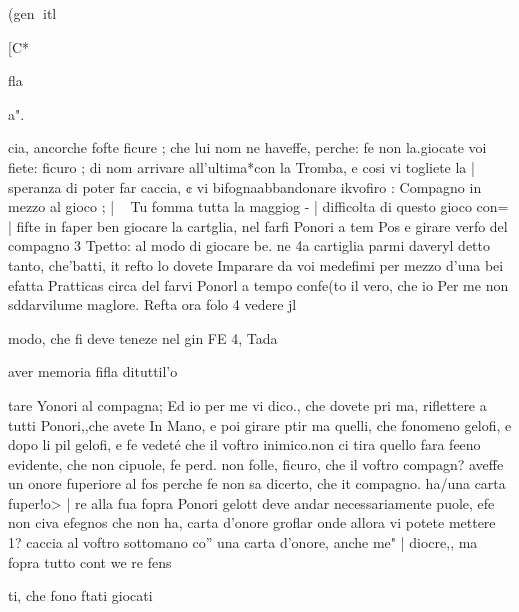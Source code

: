 \documentclass[11pt,a6paper]{article}
\begin{document}
 

 

 

 

 

 

 

 

 

 

 

(gen
itl

[C*

fla

a".

cia, ancorche fofte ficure ; che
lui nom ne haveffe, perche: fe
non la.giocate voi fiete: ficuro ;
di nom arrivare all’ultima*con
la Tromba, e cosi vi togliete la |
speranza di poter far caccia, ¢
vi bifognaabbandonare ikvofiro :
Compagno in mezzo al gioco ; |
~ Tu fomma tutta la maggiog - |
difficolta di questo gioco con= |
fifte in faper ben giocare la cartglia, nel farfi Ponori a tem Pos
e girare verfo del compagno 3
Tpetto: al modo di giocare be.
ne 4a cartiglia parmi daveryl
detto tanto, che'batti, it refto lo
dovete Imparare da voi medefimi per mezzo d’una bei efatta
Pratticas circa del farvi Ponorl
a tempo confe(to il vero, che io
Per me non sddarvilume maglore. Refta ora folo 4 vedere jl

modo, che fi deve teneze nel gin
FE 4, Tada

 

 
 

 

 

 

aver memoria fifla dituttil’o

 

tare Yonori al compagna; Ed io
per me vi dico., che dovete pri
ma, riflettere a tutti Ponori,,che
avete In Mano, e poi girare ptir
ma quelli, che fonomeno gelofi,
e dopo li pil gelofi, e fe vedeté
che il voftro inimico.non ci tira
quello fara feeno evidente, che
non cipuole, fe perd. non folle,
ficuro, che il voftro compagn?
aveffe un onore fuperiore al fos
perche fe non sa dicerto, che it
compagno. ha/una carta fuper!o> |
re alla fua fopra Ponori gelott
deve andar necessariamente
puole, efe non civa efegnos
che non ha, carta d’onore groflar
onde allora vi potete mettere 1?
caccia al voftro sottomano co”
una carta d’onore, anche me" |
diocre,, ma fopra tutto cont
we re
fens

 

ti, che fono ftati giocati
\end{document}
